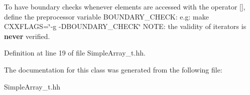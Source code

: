 To have boundary checks whenever elements are accessed with the operator [], define the preprocessor variable B\-O\-U\-N\-D\-A\-R\-Y\-\_\-\-C\-H\-E\-C\-K\-: {\ttfamily  e.\-g\-: make C\-X\-X\-F\-L\-A\-G\-S=\char`\"{}-\/g -\/\-D\-B\-O\-U\-N\-D\-A\-R\-Y\-\_\-\-C\-H\-E\-C\-K\char`\"{} } N\-O\-T\-E\-: the validity of iterators is {\bfseries never} verified. 

Definition at line 19 of file Simple\-Array\-\_\-t.\-hh.



The documentation for this class was generated from the following file\-:\begin{DoxyCompactItemize}
\item 
Simple\-Array\-\_\-t.\-hh\end{DoxyCompactItemize}

